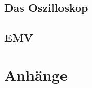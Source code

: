 \documentclass[ngerman, openany, twoside]{texdata/Script}
\begin{document}
\chapter{Das Oszilloskop}


\chapter{EMV}


%
%


\part{Anhänge}

\begin{appendix}
  
\end{appendix}


\clearpage\newpage
{}
\listoffigures

\clearpage\newpage
{}
\renewcommand*\bibname{Literatur- und Quellenverzeichnis}

%

\end{document}
